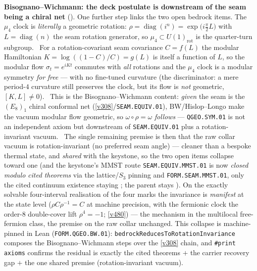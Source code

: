\par\smallskip\noindent\textbf{Bisognano--Wichmann: the deck postulate is downstream of the seam being a chiral
net} (). One further step links the two open bedrock items. The $\mu_4$ clock
is \emph{literally} a geometric rotation: $\rho=\operatorname{diag}(i^n)=\exp\!\big(i\tfrac\pi2 L\big)$ with
$L=\operatorname{diag}(n)$ the seam rotation generator, so $\mu_4\subset U(1)_{\mathrm{rot}}$ is the quarter-turn
subgroup. \mE\ For a rotation-covariant seam covariance $C=f(L)$ the modular Hamiltonian $K=\log((1{-}C)/C)=g(L)$ is
itself a function of $L$, so the modular flow $\sigma_t=e^{iKt}$ commutes with \emph{all} rotations and the $\mu_4$
clock is a modular symmetry \emph{for free} --- with no fine-tuned curvature (the discriminator: a mere period-$4$
curvature still preserves the clock, but its flow is \emph{not} geometric, $[K,L]\neq0$). \mC\ This is the
Bisognano--Wichmann content: \emph{given} the seam is the $(E_8)_1$ chiral conformal net
(\vref{v308}/\texttt{SEAM.EQUIV.01}), BW/Hislop--Longo make the vacuum modular flow geometric, so
$\omega\circ\rho=\omega$ \emph{follows} --- \texttt{QGEO.SYM.01} is not an independent axiom but downstream of
\texttt{SEAM.EQUIV.01} plus a rotation-invariant vacuum. \mO\ The single remaining premise is then that the raw
collar vacuum is rotation-invariant (no preferred seam angle) --- cleaner than a bespoke thermal state, and
\emph{shared} with the keystone, so the two open items collapse toward one (and the keystone's MMST route
\texttt{SEAM.EQUIV.MMST.01} is now
\emph{closed modulo cited theorems} via the lattice/$S_3$ pinning and \texttt{FORM.SEAM.MMST.01}, only the cited
continuum existence staying \mO; the parent stays \mO). On the exactly solvable four-interval realisation of the four marks the
invariance is \emph{manifest} at the state level ($\rho C\rho^{-1}{=}C$ at machine precision, with the
fermionic clock the order-$8$ double-cover lift $\rho^4{=}{-}1$; \vref{v480}) --- the mechanism in the
multilocal free-fermion class, the premise on the raw collar unchanged. This collapse is machine-pinned in
Lean (\texttt{FORM.QGEO.BW.01}): \texttt{bedrockReducesToRotationInvariance} composes the Bisognano--Wichmann
steps over the \vref{v308} chain, and \texttt{\#print axioms} confirms the residual is exactly the cited theorems
$+$ the carrier recovery gap $+$ the one shared premise (rotation-invariant vacuum).

